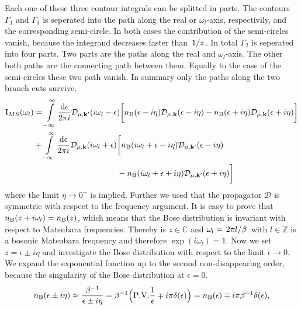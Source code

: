 Each one of these three contour integrals can be splitted in parts.
The contours $\Gamma_{1}$ and $\Gamma_{3}$ is seperated into the path along the real or $\omega_{l}$-axis, respectivily, and the corresponding semi-circle.
In both cases the contribution of the semi-circles vanish, because the integrand decreases faster than $\flatfrac{1}{z}$.
In total $\Gamma_{2}$ is seperated into four parts.
Two parts are the paths along the real and $\omega_{l}$-axis.
The other both paths are the connecting path between them.
Equally to the case of the semi-circles these two path vanish.
In summary only the paths along the two branch cuts survive.
%
\begin{align}
	\mt{I}_{MS}(\omega_{l}) &= 
		\int\limits_{-\infty}^{\infty} \frac{\dd{\epsilon}}{2\pi i} 
			\mathcal{D}_{\mu,\vb{k}'}(i\omega_{l}-\epsilon)
			\bigg[
				n_{\mt{B}}(\epsilon - i\eta) 
				\mathcal{D}_{\mu,\vb{k}}(\epsilon - i\eta) 
				- 
				n_{\mt{B}}(\epsilon + i\eta) 
				\mathcal{D}_{\mu,\vb{k}}(\epsilon + i\eta)
			\bigg]
		\notag \\ &+
		\int\limits_{-\infty}^{\infty} \frac{\dd{\epsilon}}{2\pi i} 
			\mathcal{D}_{\mu,\vb{k}}(i\omega_{l} + \epsilon)
			\bigg[
				n_{\mt{B}}(i\omega_{l} + \epsilon - i\eta)  
				\mathcal{D}_{\mu,\vb{k}'}(\epsilon - i\eta) 
				\notag \\& \hspace{3.6cm}- 
				n_{\mt{B}}(i\omega_{l} + \epsilon + i\eta)
				\mathcal{D}_{\mu,\vb{k}'}(\epsilon + i\eta)
			\bigg]
	\label{eq: Matsubara sum along axes parallel to real axis}
\end{align}
%
where the limit $\eta \to 0^{+}$ is implied.
Further we used that the propagator $\mathcal{D}$ is symmetric with respect to the frequency argument.
It is easy to prove that $n_{\mathrm{B}}(z+i\omega_{l}) = n_{\mathrm{B}}(z)$, which means that the Bose distribution is invariant with respect to Matsubara frequencies.
Thereby is $z \in \mathbb{C}$ and $\omega_{l} = \flatfrac{2\pi l}{\beta}$ with $l \in \mathbb{Z}$ is a bosonic Matsubara frequency and therefore $\exp(i\omega_{l}) = 1$.
Now we set $z = \epsilon \pm i\eta$ and investigate the Bose distribution with respect to the limit $\epsilon \to 0$.
We expand the exponential function up to the second non-disappearing order, because the singularity of the Bose distribution at $\epsilon = 0$.
%
\begin{align}
	n_{\mt{B}}(\epsilon \pm i\eta) \approx \frac{\beta^{-1}}{\epsilon \pm i\eta} = \beta^{-1} \Big( \PV{\frac{1}{\epsilon}} \mp i\pi\delta(\epsilon) \Big) = n_{\mt{B}}(\epsilon) \mp i\pi \beta^{-1} \delta(\epsilon),
	\label{eq: Bose distribution in real and imaginary part}
\end{align}

